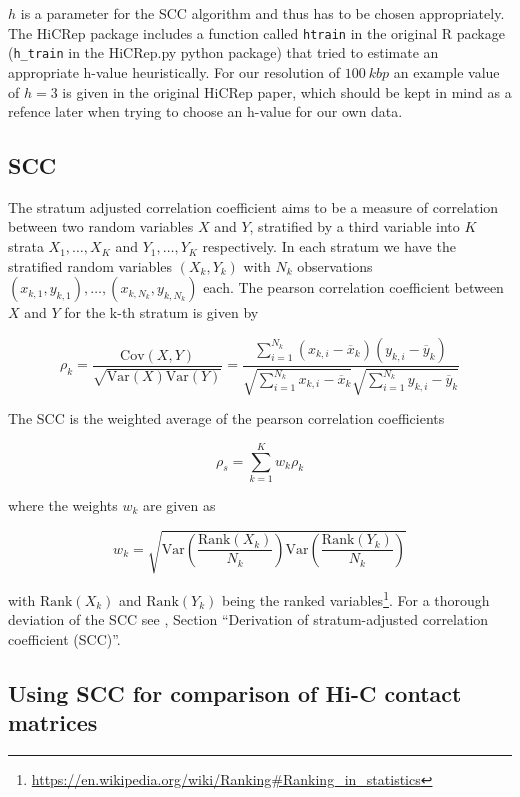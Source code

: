 \documentclass[10pt,abstract=true,titlepage=false,toc=bib]{scrartcl}
\begin{document}
\(h\) is a parameter for the SCC algorithm and thus has to be chosen appropriately. The HiCRep package includes a function called \verb|htrain| in the original R package (\verb|h_train| in the HiCRep.py python package) that tried to estimate an appropriate h-value heuristically. For our resolution of \(\SI{100}{kbp}\) an example value of \( h = 3 \) is given in the original HiCRep paper, which should be kept in mind as a refence later when trying to choose an h-value for our own data.


\subsection{SCC} %
\label{subsec:scc}

The stratum adjusted correlation coefficient aims to be a measure of correlation between two random variables \(X\) and \(Y\), stratified by a third variable into \(K\) strata \(X_1, \dots, X_K\) and \(Y_1, \dots, Y_K\) respectively. In each stratum we have the stratified random variables \((X_k, Y_k)\) with \(N_k\) observations \( (x_{k,1}, y_{k,1}), \dots, (x_{k,N_k}, y_{k,N_k}) \) each. The pearson correlation coefficient between \(X\) and \(Y\) for the k-th stratum is given by

\[
	\rho_k = \frac{ \mathrm{Cov}(X,Y) }{ \sqrt{ \mathrm{Var}(X) \mathrm{Var}(Y)} } = \frac{ \sum_{i=1}^{N_k} (x_{k,i} - \overbar{x}_k) (y_{k,i} - \overbar{y}_k) }{ \sqrt{ \sum_{i=1}^{N_k} x_{k,i} - \overbar{x}_k } \sqrt{ \sum_{i=1}^{N_k} y_{k,i} - \overbar{y}_k } }
\]

The SCC is the weighted average of the pearson correlation coefficients

\[
	\rho_s = \sum_{k=1}^{K} w_k \rho_k
\]

where the weights \(w_k\) are given as

\[
	w_k = \sqrt{ \mathrm{Var}\left( \frac{ \mathrm{Rank}(X_k) }{ N_k } \right) \mathrm{Var}\left( \frac{ \mathrm{Rank}(Y_k) }{ N_k } \right) }
\]

with \( \mathrm{Rank}(X_k) \) and \( \mathrm{Rank}(Y_k) \) being the ranked variables\footnote{\url{https://en.wikipedia.org/wiki/Ranking\#Ranking_in_statistics}}. For a thorough deviation of the SCC see \cite{yang_hicrep_2017}, Section \enquote{Derivation of stratum-adjusted correlation coefficient (SCC)}.


\subsection{Using SCC for comparison of Hi-C contact matrices} %
\label{subsec:scc_for_comparison_of_hi_c_contact_matrices}
\end{document}
